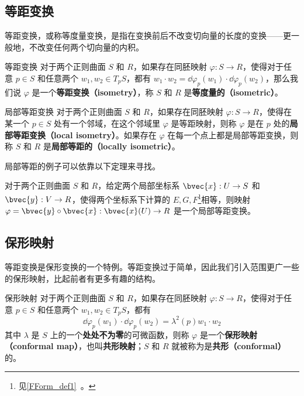 
\subsection{等距变换}
等距变换，或称等度量变换，是指在变换前后不改变切向量的长度的变换——更一般地，不改变任何两个切向量的内积。

\begin{definition}{等距变换}
对于两个正则曲面 $S$ 和 $R$，如果存在同胚映射 $\varphi:S\to R$，使得对于任意 $p\in S$ 和任意两个 $w_1, w_2\in T_pS$，都有 $w_1\cdot w_2=\dd\varphi_p(w_1)\cdot\dd\varphi_p(w_2)$，那么我们说 $\varphi$ 是一个\textbf{等距变换（isometry）}，称 $S$ 和 $R$ 是\textbf{等度量的（isometric）}。
\end{definition}

\begin{definition}{局部等距变换}
对于两个正则曲面 $S$ 和 $R$，如果存在同胚映射 $\varphi:S\to R$，使得在某一个 $p\in S$ 处有一个邻域，在这个邻域里 $\varphi$ 是等距映射，则称 $\varphi$ 是在 $p$ 处的\textbf{局部等距变换（local isometry）}。如果存在 $\varphi$ 在每一个点上都是局部等距变换，则称 $S$ 和 $R$ 是\textbf{局部等距的（locally isometric）}。
\end{definition}

局部等距的例子可以依靠以下定理来寻找。

\begin{theorem}{}
对于两个正则曲面 $S$ 和 $R$，给定两个局部坐标系 $\bvec{x}:U\to S$ 和 $\bvec{y}:V\to R$，使得两个坐标系下计算的 $E, G, F$\footnote{见\autoref{FForm_def1}~。}相等，则映射 $\varphi=\bvec{y}\circ\bvec{x}:\bvec{x}(U)\to R$ 是一个局部等距变换。
\end{theorem}

\subsection{保形映射}

等距变换是保形变换的一个特例。等距变换过于简单，因此我们引入范围更广一些的保形映射，比起前者有更多有趣的结构。

\begin{definition}{保形映射}
对于两个正则曲面 $S$ 和 $R$，如果存在同胚映射 $\varphi:S\to R$，使得对于任意 $p\in S$ 和任意两个 $w_1, w_2\in T_pS$，都有\begin{equation}
\dd\varphi_p(w_1)\cdot\dd\varphi_p(w_2)=\lambda^2(p)w_1\cdot w_2
\end{equation}
其中 $\lambda$ 是 $S$ 上的一个\textbf{处处不为零}的可微函数，则称 $\varphi$ 是一个\textbf{保形映射（conformal map）}，也叫\textbf{共形映射}；$S$ 和 $R$ 就被称为是\textbf{共形（conformal）}的。
\end{definition}

